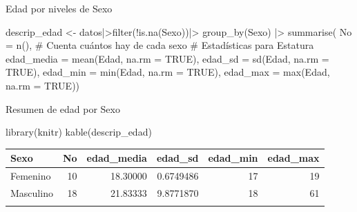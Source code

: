 \documentclass[
  ignorenonframetext,
  aspectratio=169,
  spanish,
]{beamer}
\newenvironment{Shaded}{\begin{snugshade}}{\end{snugshade}}
\newcommand{\AttributeTok}[1]{\textcolor[rgb]{0.40,0.45,0.13}{#1}}
\newcommand{\CommentTok}[1]{\textcolor[rgb]{0.37,0.37,0.37}{#1}}
\newcommand{\ConstantTok}[1]{\textcolor[rgb]{0.56,0.35,0.01}{#1}}
\newcommand{\FunctionTok}[1]{\textcolor[rgb]{0.28,0.35,0.67}{#1}}
\newcommand{\NormalTok}[1]{\textcolor[rgb]{0.00,0.23,0.31}{#1}}
\newcommand{\OtherTok}[1]{\textcolor[rgb]{0.00,0.23,0.31}{#1}}
\newcommand{\SpecialCharTok}[1]{\textcolor[rgb]{0.37,0.37,0.37}{#1}}
\begin{document}
\begin{frame}[fragile]{Edad por niveles de Sexo}
\label{edad-por-niveles-de-sexo}
\begin{Shaded}
\begin{Highlighting}[]
\NormalTok{descrip\_edad }\OtherTok{\textless{}{-}}\NormalTok{ datos}\SpecialCharTok{|\textgreater{}}\FunctionTok{filter}\NormalTok{(}\SpecialCharTok{!}\FunctionTok{is.na}\NormalTok{(Sexo))}\SpecialCharTok{|\textgreater{}}
  \FunctionTok{group\_by}\NormalTok{(Sexo) }\SpecialCharTok{|\textgreater{}} 
  \FunctionTok{summarise}\NormalTok{(}
    \AttributeTok{No =} \FunctionTok{n}\NormalTok{(), }\CommentTok{\# Cuenta cuántos hay de cada sexo}
    \CommentTok{\# Estadísticas para Estatura}
    \AttributeTok{edad\_media =} \FunctionTok{mean}\NormalTok{(Edad, }\AttributeTok{na.rm =} \ConstantTok{TRUE}\NormalTok{),}
    \AttributeTok{edad\_sd =} \FunctionTok{sd}\NormalTok{(Edad, }\AttributeTok{na.rm =} \ConstantTok{TRUE}\NormalTok{),}
    \AttributeTok{edad\_min =} \FunctionTok{min}\NormalTok{(Edad, }\AttributeTok{na.rm =} \ConstantTok{TRUE}\NormalTok{),}
    \AttributeTok{edad\_max =} \FunctionTok{max}\NormalTok{(Edad, }\AttributeTok{na.rm =} \ConstantTok{TRUE}\NormalTok{))}
\end{Highlighting}
\end{Shaded}
\end{frame}

\begin{frame}[fragile]{Resumen de edad por Sexo}
\label{resumen-de-edad-por-sexo}
\begin{Shaded}
\begin{Highlighting}[]
\FunctionTok{library}\NormalTok{(knitr)}
\FunctionTok{kable}\NormalTok{(descrip\_edad)}
\end{Highlighting}
\end{Shaded}

\begin{longtable}[]{@{}lrrrrr@{}}
\toprule\noalign{}
Sexo & No & edad\_media & edad\_sd & edad\_min & edad\_max \\
\midrule\noalign{}
\endhead
Femenino & 10 & 18.30000 & 0.6749486 & 17 & 19 \\
Masculino & 18 & 21.83333 & 9.8771870 & 18 & 61 \\
\bottomrule\noalign{}
\end{longtable}
\end{frame}
\end{document}
